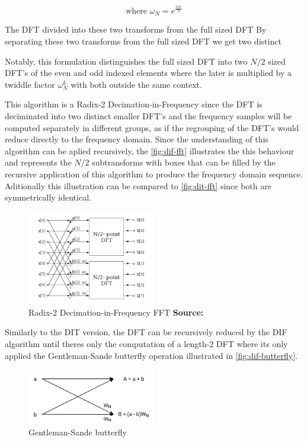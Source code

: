 \documentclass[
  oneside,
  11pt, a4paper,
  footinclude=true,
  headinclude=true,
  cleardoublepage=empty
]{scrbook}
\newcommand*{\source}[1]{%
    \textbf{Source:} \cite{#1}%
}
\begin{document}
\begin{equation*}
    \text{where } \omega_{N} = e^{\frac{i 2 \pi}{N}}
\end{equation*}

The DFT divided into these two transforms from the full sized DFT
By separating these two transforms from the full sized DFT we get two distinct 

Notably, this formulation distinguishes the full sized DFT into two \(N/2\) sized DFT's of the even and odd indexed elements where the later is multiplied by a twiddle factor \( \omega_{N}^{k} \) with both outside the same context. 

This algorithm is a Radix-2 Decimation-in-Frequency since the DFT is deciminated into two distinct smaller DFT's and the frequency samples will be computed separately in different groups, as if the regrouping of the DFT's would reduce directly to the frequency domain. Since the understanding of this algorithm can be aplied recursively, the \autoref{fig:dif-fft} illustrates the this behaviour and represents the \(N/2\) subtransforms with boxes that can be filled by the recursive application of this algorithm to produce the frequency domain sequence. Aditionally this illustration can be compared to \autoref{fig:dit-fft} since both are symmetrically identical.

\begin{figure}[h] 
    \centering
    \includegraphics[width=0.5\textwidth]{img/dif_fft.png}
    \caption{Radix-2 Decimation-in-Frequency FFT \source{jones2014digital}}
    \label{fig:dif-fft}
\end{figure}

Similarly to the DIT version, the DFT can be recursively reduced by the DIF algorithm until theres only the computation of a length-2 DFT where its only applied the Gentleman-Sande butterfly operation \cite{chu1999inside} illustrated in \autoref{fig:dif-butterfly}.

\begin{figure}[h]
    \centering
    \includegraphics[width=0.5\textwidth]{img/dif_butterfly.png}
    \caption{Gentleman-Sande butterfly}
    \label{fig:dif-butterfly}
\end{figure}
\end{document}
